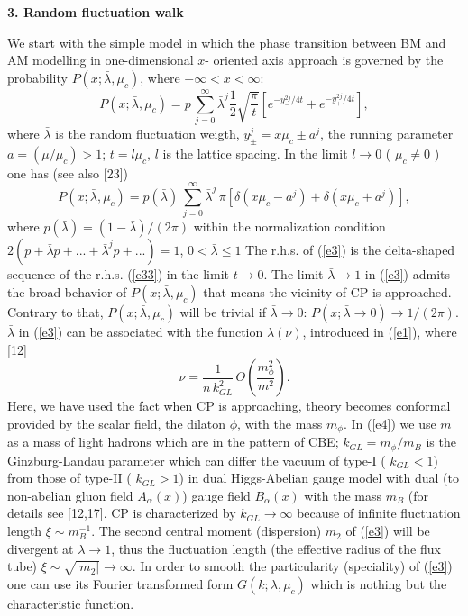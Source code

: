 \documentclass[WPCF,manyauthors]{wpcfTemplate}
\begin{document}
{\bf 3. Random fluctuation walk}

We start with the simple model in which the phase transition between BM and AM modelling in one-dimensional $x$- oriented axis approach is governed by the probability $P(x;\bar\lambda, \mu_{c})$, where $-\infty < x <\infty$:
\begin{equation}
\label{e33}
 P(x;\bar\lambda, \mu_{c}) = p\,\sum_{j=0}^{\infty}\bar\lambda ^{j}\frac{1}{2}\sqrt {\frac{\pi}{t}} 
\left [e^{{-y^{2j}_{-}}/4t} +e^{{-y^{2j}_{+}}/4t} \right ],
\end{equation} 
where $\bar\lambda$ is the random fluctuation weigth,  $y^{j}_{\pm} = x\mu_{c} \pm a^{j}$, the running parameter $a = (\mu/\mu_{c}) > 1$; $t = l\mu_{c}$, $l$  is the lattice spacing. 
In the limit $l \rightarrow 0$ 
 ( $\mu_{c} \neq 0 $ ) one has (see also [23])
\begin{equation}
\label{e3}
 P(x;\bar\lambda, \mu_{c}) = p(\bar\lambda)\,\sum_{j=0}^{\infty}\bar\lambda ^{j}\,\pi \left [\delta (x\mu_{c} - a^{j}) + \delta (x\mu_{c} + a^{j})\right ],
\end{equation} 
where $p(\bar\lambda) = (1- \bar\lambda)/(2\pi)$ within the normalization condition $2 (p+\bar\lambda p + ...+ \bar\lambda ^{j} p + ...) =1$, $0 < \bar\lambda \leq 1$ 
The r.h.s. of (\ref{e3}) is the delta-shaped sequence of the r.h.s. (\ref{e33}) in the limit $t\rightarrow 0$.
The limit $\bar\lambda\rightarrow 1$  in (\ref{e3}) admits the broad behavior of $P(x;\bar\lambda, \mu_{c})$ that means the vicinity of CP is approached. Contrary to that, $P(x;\bar\lambda, \mu_{c})$ will be trivial if $\bar\lambda\rightarrow 0$: $P(x;\bar\lambda\rightarrow 0) \rightarrow 1/(2\pi)$. $\bar\lambda$ in (\ref{e3}) can be associated with the function $\lambda (\nu)$, introduced in (\ref{e1}), where [12] 
\begin{equation}
\label{e4}
\nu = \frac{1}{n\, k^{2}_{GL}}\, O \left (\frac{m^{2}_{\phi}}{m^{2}}\right ).
\end{equation}
Here, we have used the fact when CP is approaching, theory becomes conformal provided by the scalar field, the dilaton $\phi$, with the mass $m_{\phi}$. In (\ref{e4}) we use $m$ as a mass of light hadrons which are in the pattern of  CBE; $k_{GL} = m_{\phi}/m_{B}$  is the Ginzburg-Landau parameter which can differ the vacuum of type-I ( $k_{GL} <1$) from those of type-II ( $k_{GL} >1$) in dual Higgs-Abelian gauge model with dual (to non-abelian gluon field $A_{\alpha}(x)$) gauge field $B_{\alpha}(x)$ with the mass $m_{B}$ (for details see [12,17]. CP is characterized by $k_{GL}\rightarrow\infty$ because of infinite fluctuation length $\xi \sim m_{B}^{-1}$. The second central moment (dispersion) $m_{2}$ of (\ref{e3}) will be divergent at $\lambda\rightarrow 1$, thus the fluctuation length (the effective radius of the flux tube) $\xi\sim \sqrt {\vert m_{2}\vert}\rightarrow\infty$. In order to smooth the particularity (speciality) of (\ref{e3}) one can use its Fourier transformed form $G(k;\lambda,\mu_{c})$ which is nothing but the characteristic function. 
\end{document}
